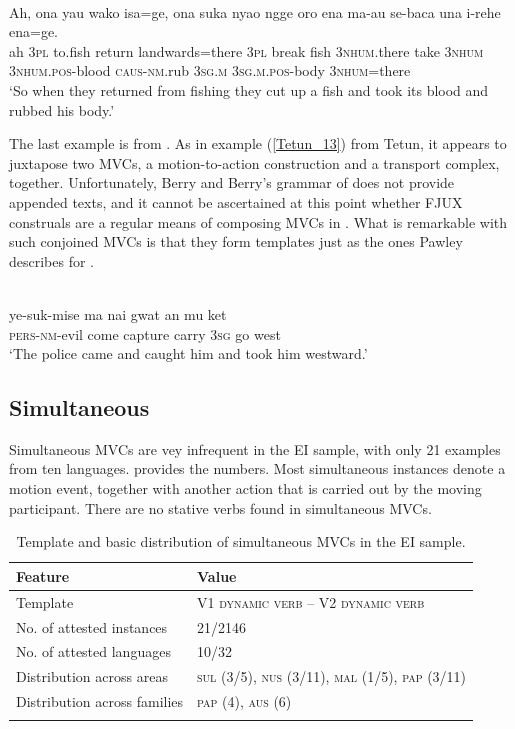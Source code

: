 \ea \label{Tidore_87}
\\
\gll Ah, ona yau wako isa=ge, ona suka nyao ngge oro ena ma-au se-baca una i-rehe ena=ge. \\
ah 3\textsc{pl} to.fish return landwards=there 3\textsc{pl} break fish 3\textsc{nhum}.there take 3\textsc{nhum} 3\textsc{nhum}.\textsc{pos}-blood \textsc{caus}-\textsc{nm}.rub 3\textsc{sg}.\textsc{m} 3\textsc{sg}.\textsc{m}.\textsc{pos}-body 3\textsc{nhum}=there \\
\glft ‘So when they returned from fishing they cut up a fish and took its blood and rubbed his body.’\\ 
\z

The last example is from . As in example (\ref{Tetun_13}) from Tetun, it appears to juxtapose two MVCs, a motion-to-action construction and a transport complex, together. Unfortunately, Berry and Berry's grammar of  does not provide appended texts, and it cannot be ascertained at this point whether FJUX construals are a regular means of composing MVCs in . What is remarkable with such conjoined MVCs is that they form templates just as the ones Pawley describes for .

\ea \label{Abun_4}
\\
\gll ye-suk-mise ma nai gwat an mu ket \\
\textsc{pers}-\textsc{nm}-evil come capture carry 3\textsc{sg} go west \\
\glft `The police came and caught him and took him westward.'\\ 
\z

\subsection{Simultaneous} \label{sec:simultaneous}

Simultaneous \textsc{MVC}s are vey infrequent in the EI sample, with only 21 examples from ten languages.  provides the numbers. Most simultaneous instances denote a motion event, together with another action that is carried out by the moving participant. There are no stative verbs found in simultaneous MVCs.

\begin{table}
\begin{tabular}{ll}
\lsptoprule
Feature&Value\tabularnewline
\midrule
Template& V1 \textsc{dynamic verb} -- V2 \textsc{dynamic verb}\tabularnewline
No. of attested instances& 21/2146 \tabularnewline
No. of attested languages& 10/32 \tabularnewline
Distribution across areas& \textsc{sul} (3/5), \textsc{nus} (3/11), \textsc{mal} (1/5), \textsc{pap} (3/11) \tabularnewline
Distribution across families& \textsc{pap} (4), \textsc{aus} (6) \tabularnewline
\lspbottomrule
\end{tabular}
\caption[Template and basic distribution of simultaneous MVCs]{Template and basic distribution of simultaneous MVCs in the EI sample.}
\label{table:simultaneous}
\end{table}

